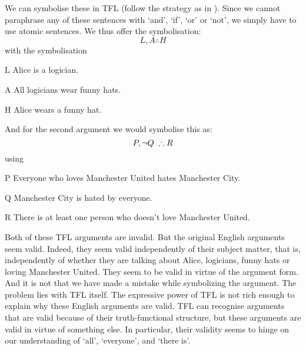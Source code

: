We can symbolise these in TFL (follow the strategy as in \pageref{s:SymbolisingComplexTFL}). Since we cannot paraphrase any of these sentences with `and', `if', `or' or `not', we simply have to use atomic sentences. We thus offer the symbolisation:
$$L, A \therefore H$$
with the symbolisation
\begin{ekey}
\item[L] Alice is a logician.
\item[A] All logicians wear funny hats.
\item[H] Alice wears a funny hat.
\end{ekey}

And for the second argument we would symbolise this as:
\begin{equation*}
P, \enot Q\; \therefore R
\end{equation*}
using
\begin{ekey}
\item[P] Everyone who loves Manchester United hates Manchester City.
\item[Q] Manchester City is hated by everyone.
\item[R] There is at least one person who doesn't love Manchester United.
\end{ekey}

Both of these TFL arguments are invalid. But the original English arguments seem valid. Indeed, they seem valid independently of their subject matter, that is, independently of whether they are talking about Alice, logicians, funny hats or loving Manchester United. They seem to be valid in virtue of the argument form. And it is not that we have made a mistake while symbolizing the argument. The problem lies with TFL itself.
The expressive power of TFL is not rich enough to explain why these English arguments are valid. TFL can recognise arguments that are valid because of their truth-functional structure, but these arguments are valid in virtue of something else. In particular, their validity seems to hinge on our understanding of `all', `everyone', and `there is'.




